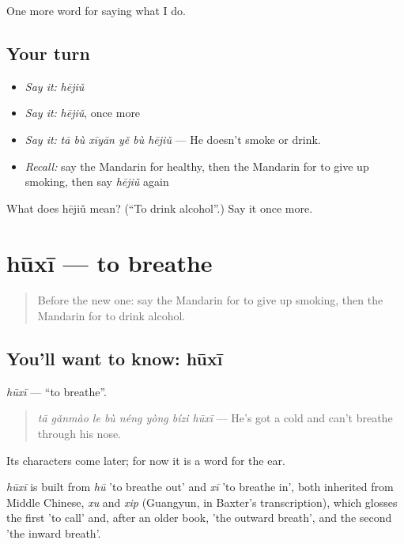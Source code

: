 \begin{grammarlens}[title={What you've built}]
One more word for saying what I do.
\end{grammarlens}

\subsection*{Your turn}
\begin{itemize}
\raggedright
  \item \emph{Say it:} \emph{hējiǔ}
  \item \emph{Say it:} \emph{hējiǔ}, once more
  \item \emph{Say it:} \emph{tā bù xīyān yě bù hējiǔ} — He doesn't smoke or drink.
  \item \emph{Recall:} say the Mandarin for healthy, then the Mandarin for to give up smoking, then say \emph{hējiǔ} again
\end{itemize}

\begin{tcolorbox}[breakable,colback=teal!4,colframe=teal!35!black,title={Before you move on}]
What does hējiǔ mean? (\textquotedblleft{}To drink alcohol\textquotedblright{}.) Say it once more.
\end{tcolorbox}
\section[hūxī]{hūxī — to breathe}

\label{lesson:ZH-C239-huxi}



\begin{quote}
Before the new one: say the Mandarin for to give up smoking, then the Mandarin for to drink alcohol.
\end{quote}

\subsection*{You'll want to know: hūxī}
\emph{hūxī} — \textquotedblleft{}to breathe\textquotedblright{}.

\begin{quote}
\emph{tā gǎnmào le bù néng yòng bízi hūxī} — He's got a cold and can't breathe through his nose.
\end{quote}

Its characters come later; for now it is a word for the ear.

\begin{cousinweb}
\emph{hūxī} is built from \emph{hū} 'to breathe out' and \emph{xī} 'to breathe in', both inherited from Middle Chinese, \emph{xu} and \emph{xip} (Guangyun, in Baxter's transcription), which glosses the first 'to call' and, after an older book, 'the outward breath', and the second 'the inward breath'.
\end{cousinweb}

